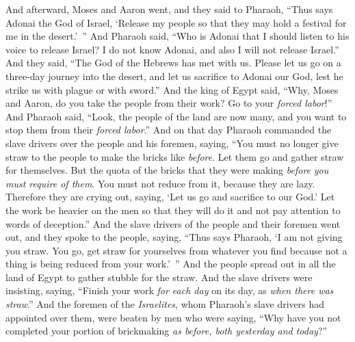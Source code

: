 \begin{biblechapter} %
 And afterward, Moses and Aaron went, and they said to Pharaoh, “Thus says Adonai the God of Israel, ‘Release my people so that they may hold a festival for me in the desert.’ ”
\verse And Pharaoh said, “Who is Adonai that I should listen to his voice to release Israel? I do not know Adonai, and also I will not release Israel.”
\verse And they said, “The God of the Hebrews has met with us. Please let us go on a three-day journey into the desert, and let us sacrifice to Adonai our God, lest he strike us with plague or with sword.”
\verse And the king of Egypt said, “Why, Moses and Aaron, do you take the people from their work? Go to your \textit{forced labor}!”
\verse And Pharaoh said, “Look, the people of the land are now many, and you want to stop them from their \textit{forced labor}.”
\verse And on that day Pharaoh commanded the slave drivers over the people and his foremen, saying,
\verse “You must no longer give straw to the people to make the bricks like \textit{before}. Let them go and gather straw for themselves.
\verse But the quota of the bricks that they were making \textit{before} \textit{you must require of them}. You must not reduce from it, because they are lazy. Therefore they are crying out, saying, ‘Let us go and sacrifice to our God.’
\verse Let the work be heavier on the men so that they will do it and not pay attention to words of deception.”
\verse And the slave drivers of the people and their foremen went out, and they spoke to the people, saying, “Thus says Pharaoh, ‘I am not giving you straw.
\verse You go, get straw for yourselves from whatever you find because not a thing is being reduced from your work.’ ”
\verse And the people spread out in all the land of Egypt to gather stubble for the straw.
\verse And the slave drivers were insisting, saying, “Finish your work \textit{for each day} on its day, as \textit{when there was straw}.”
\verse And the foremen of the \textit{Israelites}, whom Pharaoh’s slave drivers had appointed over them, were beaten by men who were saying, “Why have you not completed your portion of brickmaking \textit{as before, both yesterday and today}?”

\end{biblechapter}
